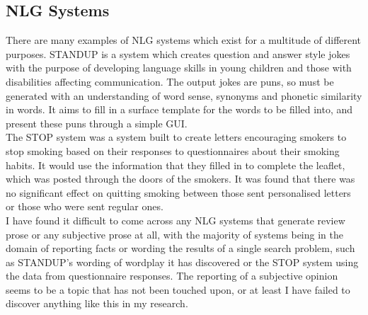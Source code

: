 \subsection{NLG Systems}
There are many examples of NLG systems which exist for a multitude of different purposes.
STANDUP\cite{standup} is a system which creates question and answer style jokes with the purpose of developing language skills in young children and those with disabilities affecting communication. The output jokes are puns, so must be generated with an understanding of word sense, synonyms and phonetic similarity in words. It aims to fill in a surface template for the words to be filled into, and present these puns through a simple GUI.\\

The STOP system\cite{stop} was a system built to create letters encouraging smokers to stop smoking based on their responses to questionnaires about their smoking habits. It would use the information that they filled in to complete the leaflet, which was posted through the doors of the smokers. It was found that there was no significant effect on quitting smoking between those sent personalised letters or those who were sent regular ones.\\

I have found it difficult to come across any NLG systems that generate review prose or any subjective prose at all, with the majority of systems being in the domain of reporting facts or wording the results of a single search problem, such as STANDUP's wording of wordplay it has discovered or the STOP system using the data from questionnaire responses. The reporting of a subjective opinion seems to be a topic that has not been touched upon, or at least I have failed to discover anything like this in my research.
